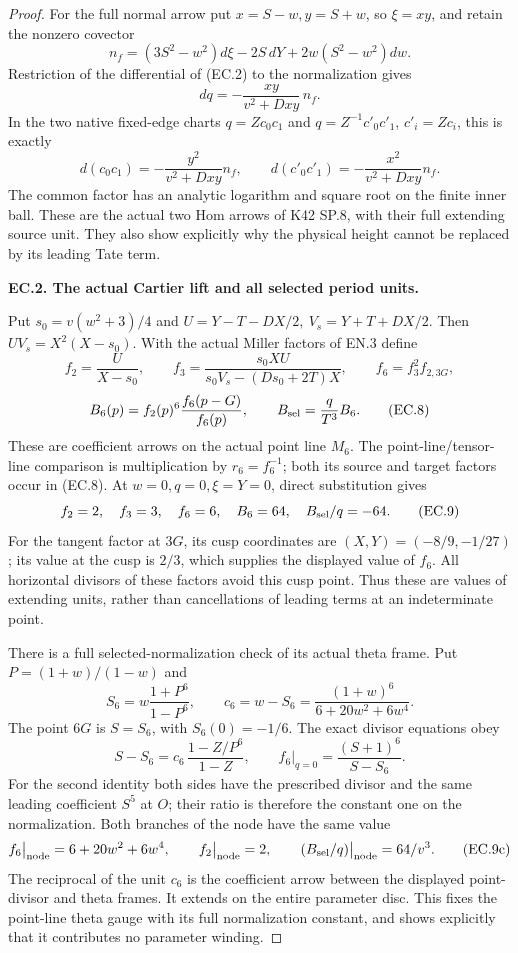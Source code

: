 \begin{proof}
For the full normal arrow put \(x=S-w,y=S+w\), so \(\xi=xy\), and
retain the nonzero covector
\[
 n_f=(3S^2-w^2)d\xi-2S\,dY+2w(S^2-w^2)dw.
\]
Restriction of the differential of (EC.2) to the normalization gives
\[
 dq=-\frac{xy}{v^2+Dxy}\,n_f.
 \tag{EC.6}
\]
In the two native fixed-edge charts \(q=Zc_0c_1\) and
\(q=Z^{-1}c'_0c'_1\), \(c'_i=Zc_i\), this is exactly
\[
 d(c_0c_1)=-\frac{y^2}{v^2+Dxy}n_f,
 \qquad d(c'_0c'_1)=-\frac{x^2}{v^2+Dxy}n_f.
 \tag{EC.7}
\]
The common factor has an analytic logarithm and square root on the
finite inner ball. These are the actual two Hom arrows of K42 SP.8,
with their full extending source unit. They also show explicitly why
the physical height cannot be replaced by its leading Tate term.

\par\medskip\noindent\textbf{EC.2. The actual Cartier lift and all selected period units.}\par\nopagebreak[4]

Put \(s_0=v(w^2+3)/4\) and
\(U=Y-T-DX/2,\ V_s=Y+T+DX/2\). Then
\(UV_s=X^2(X-s_0)\). With the actual Miller factors of EN.3 define
\[
 f_2=\frac{U}{X-s_0},\qquad
 f_3=\frac{s_0 XU}{s_0V_s-(Ds_0+2T)X},\qquad
 f_6=f_3^2f_{2,3G},
\]
\[
 B_6(p)=f_2(p)^6\frac{f_6(p-G)}{f_6(p)},\qquad
 B_{\rm sel}=\frac q{T^3}B_6.
 \tag{EC.8}
\]
These are coefficient arrows on the actual point line \(M_6\).
The point-line/tensor-line comparison is multiplication by
\(r_6=f_6^{-1}\); both its source and target factors occur in
(EC.8). At \(w=0,q=0,\xi=Y=0\), direct substitution gives
\[
 f_2=2,\quad f_3=3,\quad f_6=6,\quad
 B_6=64,\quad B_{\rm sel}/q=-64.
 \tag{EC.9}
\]
For the tangent factor at \(3G\), its cusp coordinates are
\((X,Y)=(-8/9,-1/27)\); its value at the cusp is \(2/3\),
which supplies the displayed value of \(f_6\). All horizontal
divisors of these factors avoid this cusp point. Thus these are
values of extending units, rather than cancellations of leading
terms at an indeterminate point.

There is a full selected-normalization check of its actual theta
frame. Put \(P=(1+w)/(1-w)\) and
\[
 S_6=w\frac{1+P^6}{1-P^6},\qquad
 c_6=w-S_6=\frac{(1+w)^6}{6+20w^2+6w^4}.
 \tag{EC.9a}
\]
The point \(6G\) is \(S=S_6\), with \(S_6(0)=-1/6\).
The exact divisor equations obey
\[
 S-S_6=c_6\,\frac{1-Z/P^6}{1-Z},\qquad
 f_6\big|_{q=0}=\frac{(S+1)^6}{S-S_6}.
 \tag{EC.9b}
\]
For the second identity both sides have the prescribed divisor
and the same leading coefficient \(S^5\) at \(O\); their ratio
is therefore the constant one on the normalization. Both branches
of the node have the same value
\[
 f_6\big|_{\rm node}=6+20w^2+6w^4,\qquad
 f_2\big|_{\rm node}=2,\qquad
 (B_{\rm sel}/q)\big|_{\rm node}=64/v^3.
 \tag{EC.9c}
\]
The reciprocal of the unit \(c_6\) is the coefficient arrow between
the displayed point-divisor and theta frames. It extends on the
entire parameter disc. This fixes the point-line theta gauge with
its full normalization constant, and shows explicitly that it
contributes no parameter winding.


\end{proof}
